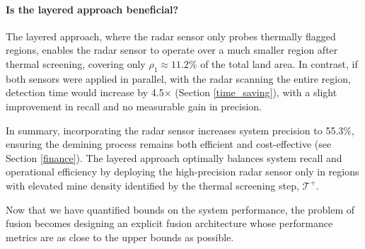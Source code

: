         \paragraph{Is the layered approach beneficial?}
        
            The layered approach, where the radar sensor only probes thermally flagged regions, enables the radar sensor to operate over a much smaller region after thermal screening, covering only $\rho_1 \approx 11.2\%$ of the total land area. In contrast, if both sensors were applied in parallel, with the radar scanning the entire region, detection time would increase by 4.5× (Section \ref{time_saving}), with a slight improvement in recall and no measurable gain in precision.

            In summary, incorporating the radar sensor increases system precision to 55.3\%, ensuring the demining process remains both efficient and cost-effective (see Section \ref{finance}). The layered approach optimally balances system recall and operational efficiency by deploying the high-precision radar sensor only in regions with elevated mine density identified by the thermal screening step, \(\mathcal{T}^+\). 

            Now that we have quantified bounds on the system performance, the problem of fusion becomes designing an explicit fusion architecture whose performance metrics are as close to the upper bounds as possible.
            

        